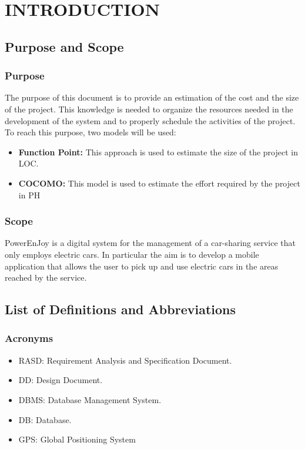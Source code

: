 \section{INTRODUCTION}
\subsection{Purpose and Scope}
\subsubsection{Purpose}
The purpose of this document is to provide an estimation of the cost and the size of the project. This knowledge is needed to organize the resources needed in the development of the system and to properly schedule the activities of the project.\newline
To reach this purpose, two models will be used:
\begin{itemize}
\item \textbf{Function Point:} This approach is used to estimate the size of the project in LOC.
\item \textbf{COCOMO:} This model is used to estimate the effort required by the project in PH
\end{itemize}

\subsubsection{Scope}
PowerEnJoy is a digital system for the management of a car-sharing service that only employs electric cars. In particular the aim is to develop a mobile application that allows the user to pick up and use electric cars in the areas reached by the service.

\subsection{List of Definitions and Abbreviations} 
\subsubsection{Acronyms}
\begin{itemize}
\item RASD: Requirement Analysis and Specification Document.
\item DD: Design Document.
\item DBMS: Database Management System.
\item DB: Database.

\item GPS: Global Positioning System

\end{itemize}
